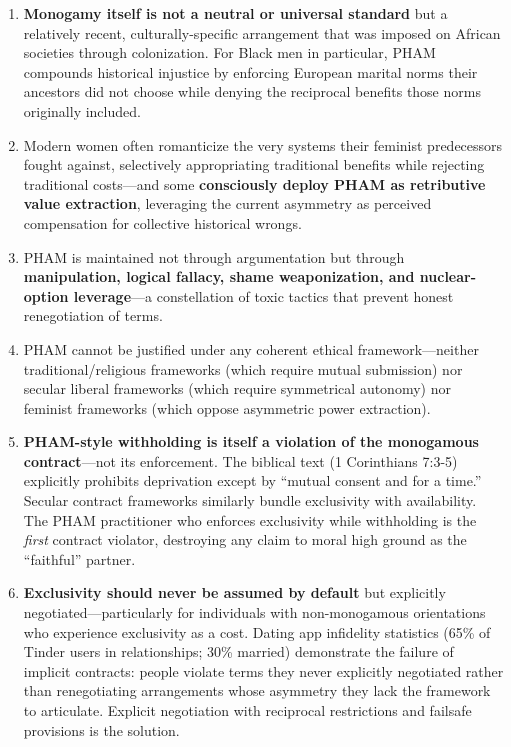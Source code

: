 \documentclass[12pt,openany]{book}
\numberwithin{equation}{chapter}
\begin{document}
\begin{enumerate}
    \item \textbf{Monogamy itself is not a neutral or universal standard} but a relatively recent, culturally-specific arrangement that was imposed on African societies through colonization. For Black men in particular, PHAM compounds historical injustice by enforcing European marital norms their ancestors did not choose while denying the reciprocal benefits those norms originally included.
    
    \item Modern women often romanticize the very systems their feminist predecessors fought against, selectively appropriating traditional benefits while rejecting traditional costs---and some \textbf{consciously deploy PHAM as retributive value extraction}, leveraging the current asymmetry as perceived compensation for collective historical wrongs.
    
    \item PHAM is maintained not through argumentation but through \textbf{manipulation, logical fallacy, shame weaponization, and nuclear-option leverage}---a constellation of toxic tactics that prevent honest renegotiation of terms.
    
    \item PHAM cannot be justified under any coherent ethical framework---neither traditional/religious frameworks (which require mutual submission) nor secular liberal frameworks (which require symmetrical autonomy) nor feminist frameworks (which oppose asymmetric power extraction).
    
    \item \textbf{PHAM-style withholding is itself a violation of the monogamous contract}---not its enforcement. The biblical text (1 Corinthians 7:3-5) explicitly prohibits deprivation except by ``mutual consent and for a time.'' Secular contract frameworks similarly bundle exclusivity with availability. The PHAM practitioner who enforces exclusivity while withholding is the \textit{first} contract violator, destroying any claim to moral high ground as the ``faithful'' partner.
    
    \item \textbf{Exclusivity should never be assumed by default} but explicitly negotiated---particularly for individuals with non-monogamous orientations who experience exclusivity as a cost. Dating app infidelity statistics (65\% of Tinder users in relationships; 30\% married) demonstrate the failure of implicit contracts: people violate terms they never explicitly negotiated rather than renegotiating arrangements whose asymmetry they lack the framework to articulate. Explicit negotiation with reciprocal restrictions and failsafe provisions is the solution.
    

\end{enumerate}
\end{document}
